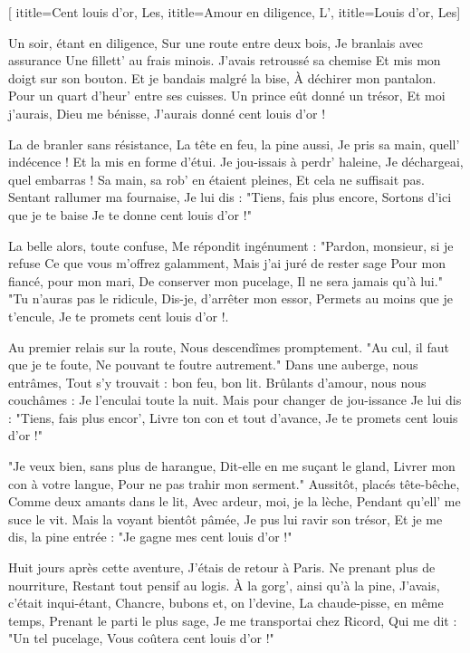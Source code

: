 [
  ititle={Cent louis d'or, Les},
  ititle={Amour en diligence, L'},
  ititle={Louis d'or, Les}]


\beginverse
Un soir, étant en diligence,
Sur une route entre deux bois,
Je branlais avec assurance
Une fillett' au frais minois.
J'avais retroussé sa chemise
Et mis mon doigt sur son bouton.
Et je bandais malgré la bise,
À déchirer mon pantalon.
Pour un quart d'heur' entre ses cuisses.
Un prince eût donné un trésor,
Et moi j'aurais, Dieu me bénisse,
J'aurais donné cent louis d'or !
\endverse

\beginverse
La de branler sans résistance,
La tête en feu, la pine aussi,
Je pris sa main, quell' indécence !
Et la mis en forme d'étui.
Je jou-issais à perdr' haleine,
Je déchargeai, quel embarras !
Sa main, sa rob' en étaient pleines,
Et cela ne suffisait pas.
Sentant rallumer ma fournaise,
Je lui dis : "Tiens, fais plus encore,
Sortons d'ici que je te baise
Je te donne cent louis d'or !"
\endverse

\beginverse
La belle alors, toute confuse,
Me répondit ingénument :
"Pardon, monsieur, si je refuse
Ce que vous m'offrez galamment,
Mais j'ai juré de rester sage
Pour mon fiancé, pour mon mari,
De conserver mon pucelage,
Il ne sera jamais qu'à lui."
"Tu n'auras pas le ridicule,
Dis-je, d'arrêter mon essor,
Permets au moins que je t'encule,
Je te promets cent louis d'or !.
\endverse

\beginverse
Au premier relais sur la route,
Nous descendîmes promptement.
"Au cul, il faut que je te foute,
Ne pouvant te foutre autrement."
Dans une auberge, nous entrâmes,
Tout s'y trouvait : bon feu, bon lit.
Brûlants d'amour, nous nous couchâmes :
Je l'enculai toute la nuit.
Mais pour changer de jou-issance
Je lui dis : "Tiens, fais plus encor',
Livre ton con et tout d'avance,
Je te promets cent louis d'or !"
\endverse

\beginverse
"Je veux bien, sans plus de harangue,
Dit-elle en me suçant le gland,
Livrer mon con à votre langue,
Pour ne pas trahir mon serment."
Aussitôt, placés tête-bêche,
Comme deux amants dans le lit,
Avec ardeur, moi, je la lèche,
Pendant qu'ell' me suce le vit.
Mais la voyant bientôt pâmée,
Je pus lui ravir son trésor,
Et je me dis, la pine entrée :
"Je gagne mes cent louis d'or !"
\endverse

\beginverse
Huit jours après cette aventure,
J'étais de retour à Paris.
Ne prenant plus de nourriture,
Restant tout pensif au logis.
À la gorg', ainsi qu'à la pine,
J'avais, c'était inqui-étant,
Chancre, bubons et, on l'devine,
La chaude-pisse, en même temps,
Prenant le parti le plus sage,
Je me transportai chez Ricord,
Qui me dit : "Un tel pucelage,
Vous coûtera cent louis d'or !"
\endverse

\endsong
